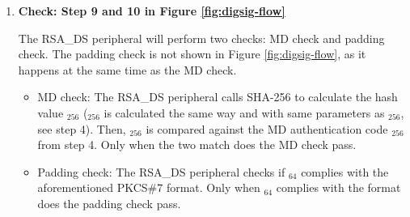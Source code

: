 \documentclass[main\_\_EN.tex]{subfiles}
\begin{document}
\begin{enumerate}
        With \begin{math}P\end{math}, the RSA\_DS peripheral can derive \begin{math}[Y]_{4096}\end{math}, \begin{math}[M]_{4096}\end{math}, \begin{math}[\overline{r}]_{4096}\end{math}, \begin{math}[M^{\prime}]_{32}\end{math}, \begin{math}[L]_{32}\end{math}, MD authentication code, and the padding value \begin{math}[\beta]_{64} \end{math}. This process is the inverse of Step 5.

    \item {\bfseries Check: Step 9 and 10 in Figure \ref{fig:digsig-flow}}

        The RSA\_DS peripheral will perform two checks: MD check and padding check. The padding check is not shown in Figure \ref{fig:digsig-flow}, as it happens at the same time as the MD check.

        \begin{itemize}

            \item MD check: The RSA\_DS peripheral calls SHA-256 to calculate the hash value \begin{math}[CALC\_MD]_{256}\end{math} (\begin{math}[CALC\_MD]_{256}\end{math} is calculated the same way and with same parameters as \begin{math}[MD]_{256}\end{math}, see step 4). Then, \begin{math}[CALC\_MD]_{256}\end{math} is compared against the MD authentication code \begin{math}[MD]_{256}\end{math} from step 4. Only when the two match does the MD check pass.

            \item Padding check: The RSA\_DS peripheral checks if \begin{math}[\beta]_{64} \end{math} complies with the aforementioned PKCS\#7 format. Only when \begin{math}[\beta]_{64} \end{math} complies with the format does the padding check pass.


\end{itemize}
\end{enumerate}
\end{document}

